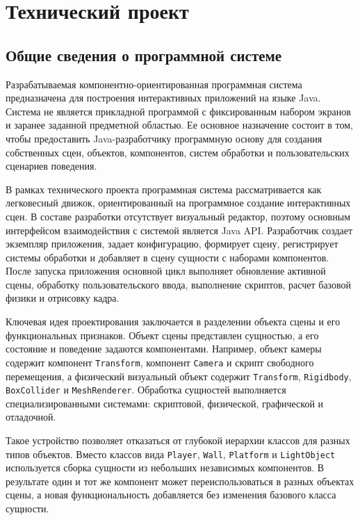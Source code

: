 
\section{Технический проект}

\subsection{Общие сведения о программной системе}

Разрабатываемая компонентно-ориентированная программная система предназначена
для построения интерактивных приложений на языке Java. Система не является
прикладной программой с фиксированным набором экранов и заранее заданной
предметной областью. Ее основное назначение состоит в том, чтобы предоставить
Java-разработчику программную основу для создания собственных сцен, объектов,
компонентов, систем обработки и пользовательских сценариев поведения.

В рамках технического проекта программная система рассматривается как
легковесный движок, ориентированный на программное создание интерактивных
сцен. В составе разработки отсутствует визуальный редактор, поэтому основным
интерфейсом взаимодействия с системой является Java API. Разработчик создает
экземпляр приложения, задает конфигурацию, формирует сцену, регистрирует
системы обработки и добавляет в сцену сущности с наборами компонентов.
После запуска приложения основной цикл выполняет обновление активной сцены,
обработку пользовательского ввода, выполнение скриптов, расчет базовой физики
и отрисовку кадра.

Ключевая идея проектирования заключается в разделении объекта сцены и его
функциональных признаков. Объект сцены представлен сущностью, а его состояние
и поведение задаются компонентами. Например, объект камеры содержит компонент
\texttt{Transform}, компонент \texttt{Camera} и скрипт свободного перемещения,
а физический визуальный объект содержит \texttt{Transform}, \texttt{Rigidbody},
\texttt{BoxCollider} и \texttt{MeshRenderer}. Обработка сущностей выполняется
специализированными системами: скриптовой, физической, графической и
отладочной.

Такое устройство позволяет отказаться от глубокой иерархии классов для
разных типов объектов. Вместо классов вида \texttt{Player}, \texttt{Wall},
\texttt{Platform} и \texttt{LightObject} используется сборка сущности из
небольших независимых компонентов. В результате один и тот же компонент может
переиспользоваться в разных объектах сцены, а новая функциональность добавляется
без изменения базового класса сущности.

